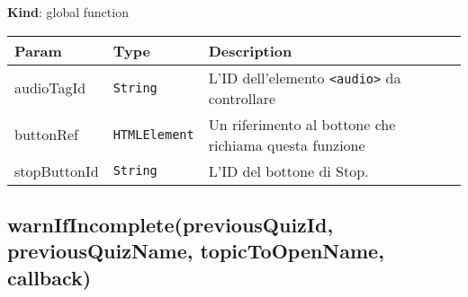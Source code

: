 \textbf{Kind}: global function

\begin{tabularx}{\textwidth}{XXX}
\toprule
\begin{minipage}[b]{0.30\columnwidth}\raggedright
Param\strut
\end{minipage} & \begin{minipage}[b]{0.30\columnwidth}\raggedright
Type\strut
\end{minipage} & \begin{minipage}[b]{0.30\columnwidth}\raggedright
Description\strut
\end{minipage}\tabularnewline
\midrule
\endhead
\begin{minipage}[t]{0.30\columnwidth}\raggedright
audioTagId\strut
\end{minipage} & \begin{minipage}[t]{0.30\columnwidth}\raggedright
\texttt{String}\strut
\end{minipage} & \begin{minipage}[t]{0.30\columnwidth}\raggedright
L'ID dell'elemento \texttt{\textless{}audio\textgreater{}} da
controllare\strut
\end{minipage}\tabularnewline
\begin{minipage}[t]{0.30\columnwidth}\raggedright
buttonRef\strut
\end{minipage} & \begin{minipage}[t]{0.30\columnwidth}\raggedright
\texttt{HTMLElement}\strut
\end{minipage} & \begin{minipage}[t]{0.30\columnwidth}\raggedright
Un riferimento al bottone che richiama questa funzione\strut
\end{minipage}\tabularnewline
\begin{minipage}[t]{0.30\columnwidth}\raggedright
stopButtonId\strut
\end{minipage} & \begin{minipage}[t]{0.30\columnwidth}\raggedright
\texttt{String}\strut
\end{minipage} & \begin{minipage}[t]{0.30\columnwidth}\raggedright
L'ID del bottone di Stop.\strut
\end{minipage}\tabularnewline
\bottomrule
\end{tabularx}

\protect\hypertarget{warnIfIncomplete}{}{}

\hypertarget{warnifincompletepreviousquizid-previousquizname-topictoopenname-callback}{%
\subsection{warnIfIncomplete(previousQuizId, previousQuizName,
topicToOpenName,
callback)}\label{warnifincompletepreviousquizid-previousquizname-topictoopenname-callback}}

